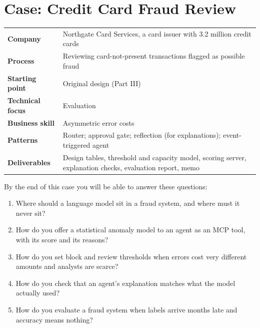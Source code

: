 
\chapter{Case: Credit Card Fraud Review}
\label{ch:case-fraud}

\begin{caseglance}
\begin{tabularx}{\linewidth}{@{}>{\bfseries}p{3.4cm}X@{}}
Company & Northgate Card Services, a card issuer with 3.2 million credit cards \\
Process & Reviewing card-not-present transactions flagged as possible fraud \\
Starting point & Original design (Part III) \\
Technical focus & Evaluation \\
Business skill & Asymmetric error costs \\
Patterns & Router; approval gate; reflection (for explanations); event-triggered agent \\
Deliverables & Design tables, threshold and capacity model, scoring server, explanation checks, evaluation report, memo
\end{tabularx}
\end{caseglance}

\begin{chapterquestions}
By the end of this case you will be able to answer these questions:
\begin{enumerate}[leftmargin=*,itemsep=2pt]
  \item Where should a language model sit in a fraud system, and where must it never sit?
  \item How do you offer a statistical anomaly model to an agent as an MCP tool, with its score and its reasons?
  \item How do you set block and review thresholds when errors cost very different amounts and analysts are scarce?
  \item How do you check that an agent's explanation matches what the model actually used?
  \item How do you evaluate a fraud system when labels arrive months late and accuracy means nothing?
\end{enumerate}
\end{chapterquestions}

